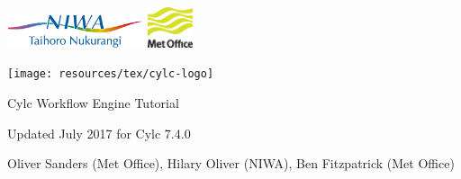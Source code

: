 \thispagestyle{empty}

\begin{titlepage}
        \includegraphics[width=0.3\textwidth]{resources/NIWA-logo}
        \hspace*{0.6\textwidth}
        \includegraphics[width=0.1\textwidth]{resources/Met_Office}

    \begin{center}
        \texttt{[image: resources/tex/cylc-logo]}

        \Huge{Cylc Workflow Engine Tutorial}

        \large{Updated July 2017 for Cylc 7.4.0}

        \large{Oliver Sanders (Met Office), Hilary
        Oliver (NIWA), Ben Fitzpatrick (Met Office)}

    \end{center}

\tableofcontents
\end{titlepage}
